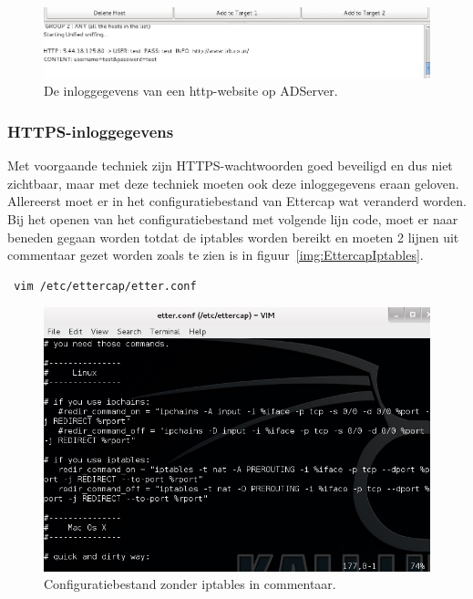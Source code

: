 \documentclass[pdftex,a4paper,12pt]{report}
\begin{document}
\begin{figure}[H]
\begin{center}
\includegraphics[scale=0.60]{img/EttercapInlogHTTP}
\end{center}
\caption{De inloggegevens van een http-website op ADServer.}
\label{img:EttercapInlogHTTP}
\end{figure}

\subsubsection{HTTPS-inloggegevens}
Met voorgaande techniek zijn HTTPS-wachtwoorden goed beveiligd en dus niet zichtbaar, maar met deze techniek moeten ook deze inloggegevens eraan geloven. Allereerst moet er in het configuratiebestand van Ettercap wat veranderd worden. Bij het openen van het configuratiebestand met volgende lijn code, moet er naar beneden gegaan worden totdat de iptables worden bereikt en moeten 2 lijnen uit commentaar gezet worden zoals te zien is in figuur~\ref{img:EttercapIptables}.
\begin{verbatim} vim /etc/ettercap/etter.conf \end{verbatim}

\begin{figure}[H]
\begin{center}
\includegraphics[scale=0.60]{img/EttercapIptables}
\end{center}
\caption{Configuratiebestand zonder iptables in commentaar.}
\label{img:EtterIptables}
\end{figure}
\end{document}
